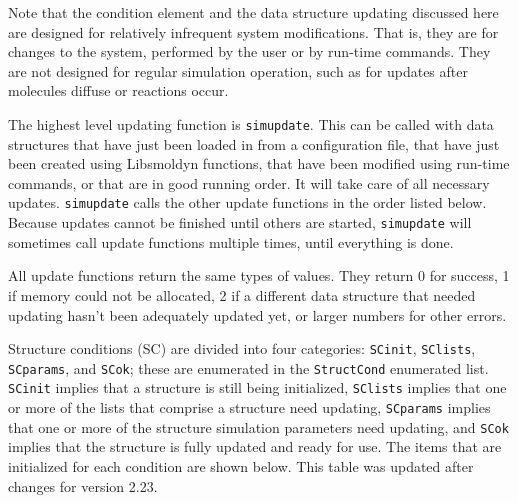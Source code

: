 \documentclass {book}
\newcommand {\ttt} {\texttt}
\begin{document}
Note that the condition element and the data structure updating discussed here are designed for relatively infrequent system modifications. That is, they are for changes to the system, performed by the user or by run-time commands. They are not designed for regular simulation operation, such as for updates after molecules diffuse or reactions occur.

The highest level updating function is \ttt{simupdate}. This can be called with data structures that have just been loaded in from a configuration file, that have just been created using Libsmoldyn functions, that have been modified using run-time commands, or that are in good running order. It will take care of all necessary updates. \ttt{simupdate} calls the other update functions in the order listed below. Because updates cannot be finished until others are started, \ttt{simupdate} will sometimes call update functions multiple times, until everything is done.

All update functions return the same types of values. They return 0 for success, 1 if memory could not be allocated, 2 if a different data structure that needed updating hasn't been adequately updated yet, or larger numbers for other errors.

Structure conditions (SC) are divided into four categories: \ttt{SCinit}, \ttt{SClists}, \ttt{SCparams}, and \ttt{SCok}; these are enumerated in the \ttt{StructCond} enumerated list. \ttt{SCinit} implies that a structure is still being initialized, \ttt{SClists} implies that one or more of the lists that comprise a structure need updating, \ttt{SCparams} implies that one or more of the structure simulation parameters need updating, and \ttt{SCok} implies that the structure is fully updated and ready for use. The items that are initialized for each condition are shown below. This table was updated after changes for version 2.23.
\end{document}
